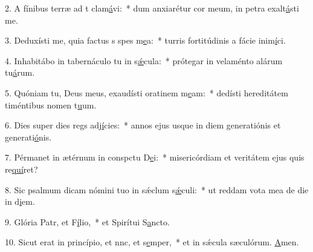 2. A fínibus terræ ad t clam\uline{á}vi:~* dum anxiarétur cor meum, in petra exalt\uline{á}sti me.\par 
3. Deduxísti me, quia factus s spes m\uline{e}a:~* turris fortitúdinis a fácie inim\uline{í}ci.\par 
4. Inhabitábo in tabernáculo tu in s\uline{ǽ}cula:~* prótegar in velaménto alárum tu\uline{á}rum.\par 
5. Quóniam tu, Deus meus, exaudísti oratinem m\uline{e}am:~* dedísti hereditátem timéntibus nomen t\uline{u}um.\par 
6. Dies super dies regs adj\uline{í}cies:~* annos ejus usque in diem generatiónis et generati\uline{ó}nis.\par 
7. Pérmanet in ætérnum in conspctu D\uline{e}i:~* misericórdiam et veritátem ejus quis re\uline{quí}ret?\par 
8. Sic psalmum dicam nómini tuo in sǽclum s\uline{ǽ}culi:~* ut reddam vota mea de die in d\uline{i}em.\par 
9. Glória Patr, et F\uline{í}lio,~* et Spirítui S\uline{a}ncto.\par 
10. Sicut erat in princípio, et nnc, et s\uline{e}mper,~* et in sǽcula sæculórum. \uline{A}men.\par 
